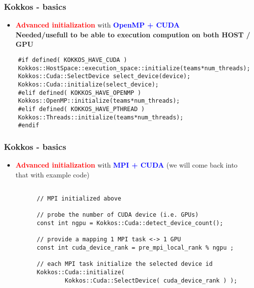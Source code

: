\begin{frame}[fragile=singleslide]
  \frametitle{Kokkos - basics}

  \begin{itemize}
  \item \textcolor{red}{\textbf{Advanced initialization}} with \textcolor{blue}{\textbf{OpenMP + CUDA}}\\
    \textbf{Needed/usefull to be able to execution compution on both HOST / GPU}
  \end{itemize}
  \begin{verbatim}
    #if defined( KOKKOS_HAVE_CUDA )
    Kokkos::HostSpace::execution_space::initialize(teams*num_threads);
    Kokkos::Cuda::SelectDevice select_device(device);
    Kokkos::Cuda::initialize(select_device);
    #elif defined( KOKKOS_HAVE_OPENMP )
    Kokkos::OpenMP::initialize(teams*num_threads);
    #elif defined( KOKKOS_HAVE_PTHREAD )
    Kokkos::Threads::initialize(teams*num_threads);
    #endif
  \end{verbatim}
\end{frame}


\begin{frame}[fragile=singleslide]
  \frametitle{Kokkos - basics}

  \begin{itemize}
  \item \textcolor{red}{\textbf{Advanced initialization}} with \textcolor{blue}{\textbf{MPI + CUDA}}
    (we will come back into that with example code)
    \begin{verbatim}

      // MPI initialized above

      // probe the number of CUDA device (i.e. GPUs)
      const int ngpu = Kokkos::Cuda::detect_device_count();

      // provide a mapping 1 MPI task <-> 1 GPU
      const int cuda_device_rank = pre_mpi_local_rank % ngpu ;

      // each MPI task initialize the selected device id
      Kokkos::Cuda::initialize(
              Kokkos::Cuda::SelectDevice( cuda_device_rank ) );
    \end{verbatim}
  \end{itemize}
\end{frame}
